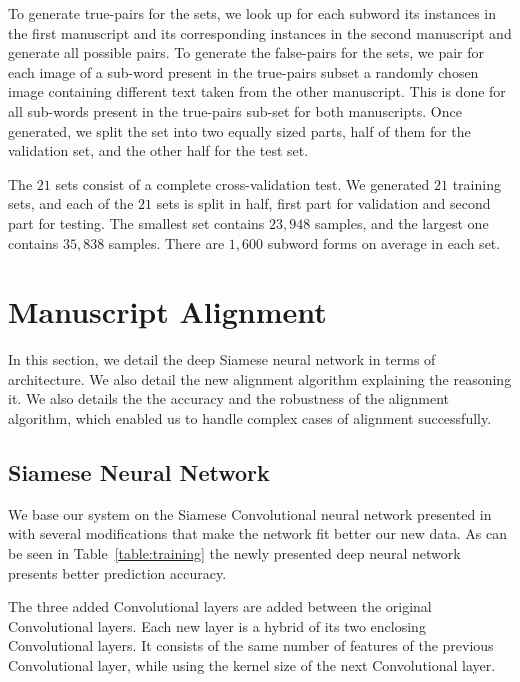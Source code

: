 \documentclass[10pt, a4paper, conference, compsocconf]{IEEEtran}
\begin{document}
To generate true-pairs for the sets, we look up for each subword its instances in the first manuscript and its corresponding instances in the second manuscript and generate all possible pairs. To generate the false-pairs for the sets, we pair for each image of a sub-word present in the true-pairs subset a randomly chosen image containing different text taken from the other manuscript. This is done for all sub-words present in the true-pairs sub-set for both manuscripts. Once generated, we split the set into two equally sized parts, half of them for the validation set, and the other half for the test set.

The $21$ sets consist of a complete cross-validation test. We generated $21$ training sets, and each of the $21$ sets is split in half, first part  for validation and second part for testing. The smallest set contains $23,948$ samples, and the largest one contains $35,838$ samples. There are $1,600$ subword forms on average in each set.

\section{Manuscript Alignment}
In this section, we detail the deep Siamese neural network in terms of architecture. We also detail the new alignment algorithm explaining the reasoning it. We also details the the accuracy and the robustness of the alignment algorithm, which enabled us to handle complex cases of alignment successfully.

\subsection{Siamese Neural Network}
We base our system on the Siamese Convolutional neural network presented in~\cite{kassis2017siamese} with several modifications that make the network fit better our new data. As can be seen in Table~\ref{table:training} the newly presented deep neural network presents better prediction accuracy. 

The three added Convolutional layers are added between the original Convolutional layers. Each new layer is a hybrid of its two enclosing Convolutional layers. It consists of the same number of features of the previous Convolutional layer, while using the kernel size of the next Convolutional layer.
\end{document}
